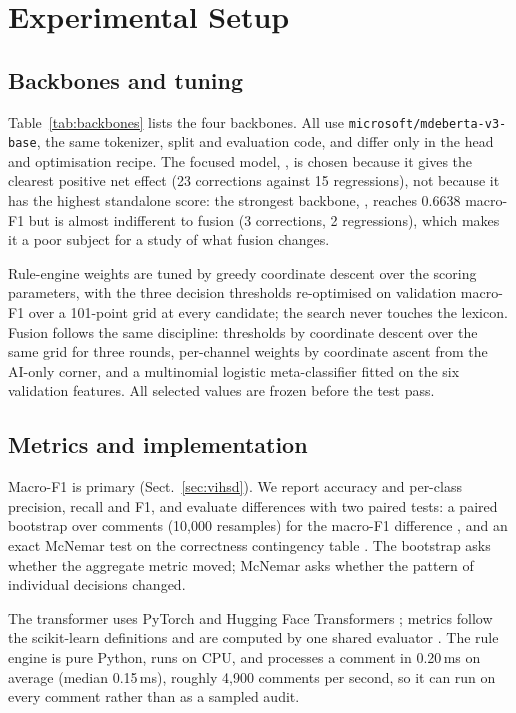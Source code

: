 \section{Experimental Setup}
\label{sec:setup}

\subsection{Backbones and tuning}
\label{sec:backbones}

Table~\ref{tab:backbones} lists the four backbones. All use
\texttt{microsoft/mdeberta-v3-base}, the same tokenizer, split and evaluation code,
and differ only in the head and optimisation recipe. The focused model,
, is chosen because it gives the clearest positive net
effect (23 corrections against 15 regressions), not because it has the highest
standalone score: the strongest backbone, , reaches
0.6638 macro-F1 but is almost indifferent to fusion (3 corrections, 2 regressions),
which makes it a poor subject for a study of what fusion changes.



Rule-engine weights are tuned by greedy coordinate descent over the scoring
parameters, with the three decision thresholds re-optimised on validation macro-F1
over a 101-point grid at every candidate; the search never touches the lexicon.
Fusion follows the same discipline: thresholds by coordinate descent over the same
grid for three rounds, per-channel weights by coordinate ascent from the AI-only
corner, and a multinomial logistic meta-classifier fitted on the six validation
features. All selected values are frozen before the test pass.

\subsection{Metrics and implementation}
\label{sec:metrics}

Macro-F1 is primary (Sect.~\ref{sec:vihsd}). We report accuracy and per-class
precision, recall and F1, and evaluate differences with two
paired tests: a paired bootstrap over comments (10{,}000 resamples) for the
macro-F1 difference \cite{efron1993bootstrap}, and an exact McNemar test on the
correctness contingency table \cite{mcnemar1947note}. The bootstrap asks whether
the aggregate metric moved; McNemar asks whether the pattern of individual
decisions changed.

The transformer uses PyTorch and Hugging Face Transformers
\cite{wolf2020transformers}; metrics follow the scikit-learn definitions and are
computed by one shared evaluator \cite{saito2015precision}. The rule engine is pure
Python, runs on CPU, and processes a comment in 0.20\,ms on average (median 0.15\,ms),
roughly 4{,}900 comments per second, so it can run on every comment rather than as
a sampled audit.

